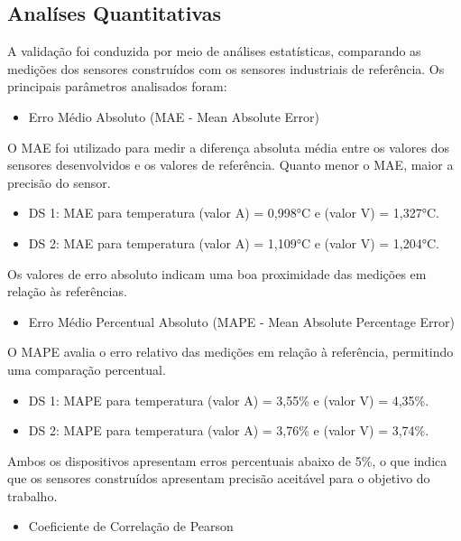     


	\subsection{Analíses Quantitativas}
	
	A validação foi conduzida por meio de análises estatísticas, comparando as medições dos sensores construídos com os sensores industriais de referência. Os principais parâmetros analisados foram:


	\begin{itemize}
		\item  Erro Médio Absoluto (MAE - Mean Absolute Error)
		\end{itemize}
		\tab O \acrshort{MAE} foi utilizado para medir a diferença absoluta média entre os valores dos sensores desenvolvidos e os valores de referência. Quanto menor o \acrshort{MAE}, maior a precisão do sensor.
			\begin{itemize}
				\item \acrshort{DS} 1: \acrshort{MAE} para temperatura (valor A) = 0,998°C e (valor V) = 1,327°C.
				\item \acrshort{DS} 2: \acrshort{MAE} para temperatura (valor A) = 1,109°C e (valor V) = 1,204°C.
			\end{itemize}
		\indent Os valores de erro absoluto indicam uma boa proximidade das medições em relação às referências.
	\begin{itemize}
		\item Erro Médio Percentual Absoluto (MAPE - Mean Absolute Percentage Error)
		\end{itemize}
		\tab O \acrshort{MAPE} avalia o erro relativo das medições em relação à referência, permitindo uma comparação percentual.
		\begin{itemize}
			\item \acrshort{DS} 1: \acrshort{MAPE} para temperatura (valor A) = 3,55\% e (valor V) = 4,35\%.
			\item \acrshort{DS} 2: \acrshort{MAPE} para temperatura (valor A) = 3,76\% e (valor V) = 3,74\%.
		\end{itemize}
		\indent Ambos os dispositivos apresentam erros percentuais abaixo de 5\%, o que indica que os sensores construídos apresentam precisão aceitável para o objetivo do trabalho.
	\begin{itemize}	
		\item Coeficiente de Correlação de Pearson
		\end{itemize}
